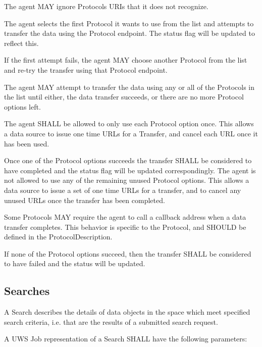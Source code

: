\documentclass[11pt,a4paper]{ivoa}
\begin{document}
The agent MAY ignore Protocols URIs that it does not recognize.

The agent selects the first Protocol it wants to use from the list and attempts to transfer the data using the Protocol endpoint. The status flag will be updated to reflect this.

If the first attempt fails, the agent MAY choose another Protocol from the list and re-try the transfer using that Protocol endpoint.

The agent MAY attempt to transfer the data using any or all of the Protocols in the list until either, the data transfer succeeds, or there are no more Protocol options left.

The agent SHALL be allowed to only use each Protocol option once. This allows a data source to issue one time URLs for a Transfer, and cancel each URL once it has been used.

Once one of the Protocol options succeeds the transfer SHALL be considered to have completed and the status flag will be updated correspondingly. The agent is not allowed to use any of the remaining unused Protocol options. This allows a data source to issue a set of one time URLs for a transfer, and to cancel any unused URLs once the transfer has been completed.

Some Protocols MAY require the agent to call a callback address when a data transfer completes. This behavior is specific to the Protocol, and SHOULD be defined in the ProtocolDescription.

If none of the Protocol options succeed, then the transfer SHALL be considered to have failed and the status will be updated.

\subsection{Searches}
\label{subsec:searches}
A Search describes the details of data objects in the space which meet specified search criteria, i.e. that are the results of a submitted search request.

A UWS Job representation of a Search SHALL have the following parameters:
\end{document}
